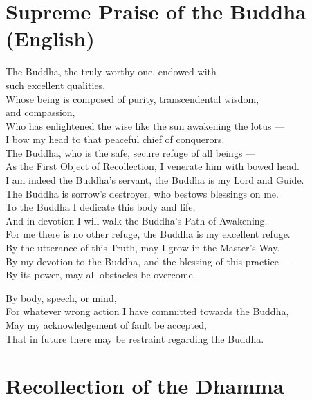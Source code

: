 \section*{Supreme Praise of the Buddha (English)}

\begin{leader}
\end{leader}

The Buddha, the truly worthy one, endowed with\\
\vin such excellent qualities,\\
Whose being is composed of purity, transcendental wisdom,\\
\vin and compassion,\\
Who has enlightened the wise like the sun awakening the lotus ---\\
I bow my head to that peaceful chief of conquerors.\\
The Buddha, who is the safe, secure refuge of all beings ---\\
As the First Object of Recollection, I venerate him with bowed head.\\
I am indeed the Buddha's servant, the Buddha is my Lord and Guide.\\
The Buddha is sorrow's destroyer, who bestows blessings on me.\\
To the Buddha I dedicate this body and life,\\
And in devotion I will walk the Buddha's Path of Awakening.\\
For me there is no other refuge, the Buddha is my excellent refuge.\\
By the utterance of this Truth, may I grow in the Master's Way.\\
By my devotion to the Buddha, and the blessing of this practice ---\\
By its power, may all obstacles be overcome.


By body, speech, or mind,\\
For whatever wrong action I have committed towards the Buddha,\\
May my acknowledgement of fault be accepted,\\
That in future there may be restraint regarding the Buddha.

\section*{Recollection of the Dhamma}

